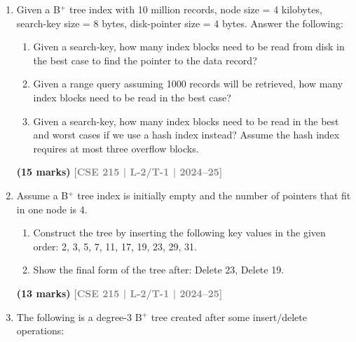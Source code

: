 \documentclass[12pt]{article}
\newcommand{\yr}[1]{\hfill\textcolor{gray}{\small\textbf{[#1]}}}
\newcommand{\mk}[1]{\textcolor{orange!70!black}{\small\textbf{(#1 marks)}}}
\begin{document}
\begin{enumerate}

\item Given a B$^+$ tree index with 10 million records, node size = 4 kilobytes, search-key size = 8 bytes, disk-pointer size = 4 bytes. Answer the following:
\begin{enumerate}
  \item Given a search-key, how many index blocks need to be read from disk in the best case to find the pointer to the data record?
  \item Given a range query assuming 1000 records will be retrieved, how many index blocks need to be read in the best case?
  \item Given a search-key, how many index blocks need to be read in the best and worst cases if we use a hash index instead? Assume the hash index requires at most three overflow blocks.
\end{enumerate}
\mk{15} \yr{CSE 215 | L-2/T-1 | 2024--25}


\item Assume a B$^+$ tree index is initially empty and the number of pointers that fit in one node is 4.
\begin{enumerate}
  \item Construct the tree by inserting the following key values in the given order: 2, 3, 5, 7, 11, 17, 19, 23, 29, 31.
  \item Show the final form of the tree after: Delete 23, Delete 19.
\end{enumerate}
\mk{13} \yr{CSE 215 | L-2/T-1 | 2024--25}


\item The following is a degree-3 B$^+$ tree created after some insert/delete operations:
\begin{center}

\end{center}
\end{enumerate}
\end{document}

